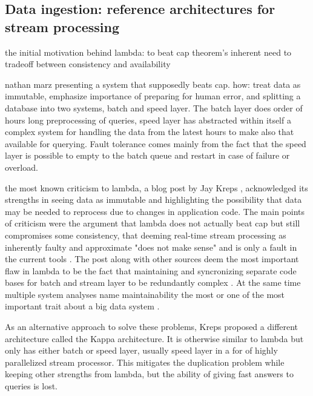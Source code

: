 
\subsection{Data ingestion: reference architectures for stream processing}

the initial motivation behind lambda: to beat cap theorem's inherent need to tradeoff between consistency and availability \cite{lambdakappa}

nathan marz presenting a system that supposedly beats cap. how: treat data as immutable, emphasize importance of preparing for human error, and splitting a database into two systems, batch and speed layer. The batch layer does order of hours long preprocessing of queries, speed layer has  abstracted within itself a complex system for handling the data from the latest hours to make also that available for querying. Fault tolerance comes mainly from the fact that the speed layer is possible to empty to the batch queue and restart in case of failure or overload.

the most known criticism to lambda, a blog post by Jay Kreps \cite{questioninglambda}, acknowledged its strengths in seeing data as immutable and highlighting the possibility that data may be needed to reprocess due to changes in application code. The main points of criticism were the argument that lambda does not actually beat cap but still compromises some consistency, that deeming real-time stream processing as inherently faulty and approximate "does not make sense" and is only a fault in the current tools \cite{questioninglambda}. The post along with other sources deem the most important flaw in lambda to be the fact that maintaining and syncronizing separate code bases for batch and stream layer to be redundantly complex \cite{uber} \cite{facebook}. At the same time multiple system analyses name maintainability the most or one of the most important trait about a big data system \cite{facebook} \cite{storm@twitter}.

As an alternative approach to solve these problems, Kreps proposed a different architecture called the Kappa architecture. It is otherwise similar to lambda but only has either batch or speed layer, usually speed layer in a for of highly parallelized stream processor. This mitigates the duplication problem while keeping other strengths from lambda, but the ability of giving fast answers to queries is lost.

